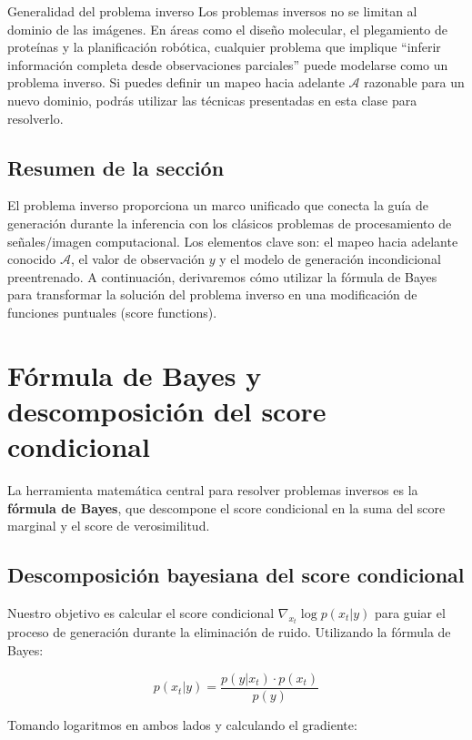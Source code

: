 \documentclass[a4paper]{article}
\begin{document}
\begin{knowledgebox}{Generalidad del problema inverso}
Los problemas inversos no se limitan al dominio de las imágenes. En áreas como el diseño molecular, el plegamiento de proteínas y la planificación robótica, cualquier problema que implique ``inferir información completa desde observaciones parciales'' puede modelarse como un problema inverso. Si puedes definir un mapeo hacia adelante $\mathcal{A}$ razonable para un nuevo dominio, podrás utilizar las técnicas presentadas en esta clase para resolverlo.
\end{knowledgebox}

\subsection{Resumen de la sección}

El problema inverso proporciona un marco unificado que conecta la guía de generación durante la inferencia con los clásicos problemas de procesamiento de señales/imagen computacional. Los elementos clave son: el mapeo hacia adelante conocido $\mathcal{A}$, el valor de observación $y$ y el modelo de generación incondicional preentrenado. A continuación, derivaremos cómo utilizar la fórmula de Bayes para transformar la solución del problema inverso en una modificación de funciones puntuales (score functions).

\section{Fórmula de Bayes y descomposición del score condicional}

La herramienta matemática central para resolver problemas inversos es la \textbf{fórmula de Bayes}, que descompone el score condicional en la suma del score marginal y el score de verosimilitud.

\subsection{Descomposición bayesiana del score condicional}

Nuestro objetivo es calcular el score condicional $\nabla_{x_t} \log p(x_t | y)$ para guiar el proceso de generación durante la eliminación de ruido. Utilizando la fórmula de Bayes:

$$
p(x_t | y) = \frac{p(y | x_t) \cdot p(x_t)}{p(y)}
$$

Tomando logaritmos en ambos lados y calculando el gradiente:
\end{document}

